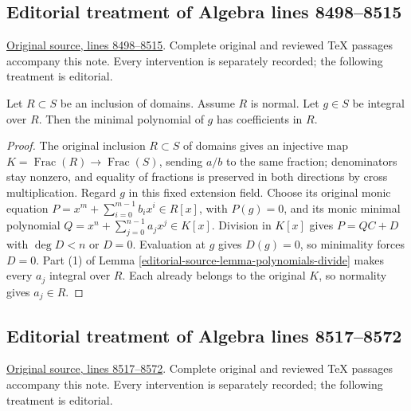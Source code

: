 \subsection{Editorial treatment of Algebra lines 8498--8515}

\hypertarget{algebra-context-095}{}

\noindent\href{https://github.com/stacks/stacks-project/blob/a04446e57ec1fbc252a871afcec7752fb2807b14/algebra.tex\#L8498}{Original source, lines 8498--8515}. Complete original and reviewed TeX passages accompany this note. Every intervention is separately recorded; the following treatment is editorial.


\begin{lemma}
\label{editorial-source-lemma-minimal-polynomial-normal-domain}
Let $R \subset S$ be an inclusion of domains.
Assume $R$ is normal. Let $g \in S$ be integral
over $R$. Then the minimal polynomial of $g$
has coefficients in $R$.
\end{lemma}

\begin{proof}
The original inclusion $R\subset S$ of domains gives an
injective map $K=\operatorname{Frac}(R)\to\operatorname{Frac}(S)$,
sending $a/b$ to the same fraction; denominators stay nonzero,
and equality of fractions is preserved in both directions by
cross multiplication. Regard $g$ in this fixed extension field.
Choose its original monic equation
$P=x^m+\sum_{i=0}^{m-1}b_ix^i\in R[x]$, with $P(g)=0$,
and its monic minimal polynomial
$Q=x^n+\sum_{j=0}^{n-1}a_jx^j\in K[x]$.
Division in $K[x]$ gives $P=QC+D$ with $\deg D<n$ or $D=0$.
Evaluation at $g$ gives $D(g)=0$, so minimality forces $D=0$.
Part (1) of Lemma \ref{editorial-source-lemma-polynomials-divide} makes every
$a_j$ integral over $R$. Each already belongs to the original
$K$, so normality gives $a_j\in R$.
\end{proof}


\subsection{Editorial treatment of Algebra lines 8517--8572}

\hypertarget{algebra-context-096}{}

\noindent\href{https://github.com/stacks/stacks-project/blob/a04446e57ec1fbc252a871afcec7752fb2807b14/algebra.tex\#L8517}{Original source, lines 8517--8572}. Complete original and reviewed TeX passages accompany this note. Every intervention is separately recorded; the following treatment is editorial.


